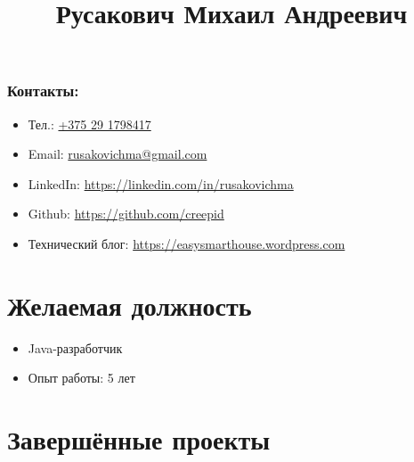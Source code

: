 \documentclass[a4paper, 12pt]{article}
\title{Русакович Михаил Андреевич}
\author{}
\date{}
\begin{document}
\maketitle

\subsubsection*{Контакты:}
\begin{itemize}
    \item Тел.: \href{tel:+375291798417}{+375 29 1798417}
    \item Email: \href{mailto:rusakovichma@gmail.com}{rusakovichma@gmail.com}
    \item LinkedIn: \href{https://linkedin.com/in/rusakovichma
}{https://linkedin.com/in/rusakovichma}
    \item Github: \href{https://github.com/creepid}{https://github.com/creepid}
    \item Технический блог: \href{https://easysmarthouse.wordpress.com}{https://easysmarthouse.wordpress.com}
\end{itemize}


\section*{Желаемая должность}

    \begin{itemize}
        \item Java-разработчик
        \item Опыт работы: 5 лет
    \end{itemize}


\section*{Завершённые проекты}
\end{document}
